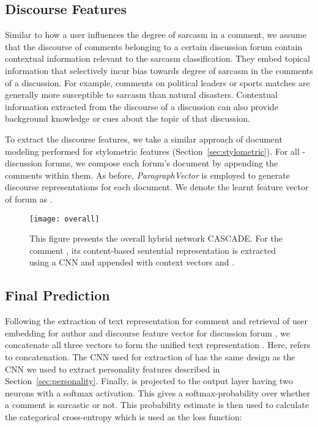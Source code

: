 \documentclass[11pt]{article}
\begin{document}
{\vspace{-0.3cm}
\subsection{Discourse Features} \label{sec:discourse}

Similar to how a user influences the degree of sarcasm in a comment, we assume that the discourse of  comments belonging to a certain discussion forum contain contextual information relevant to the sarcasm classification. They embed topical information that selectively incur bias towards degree of sarcasm in the comments of a discussion. For example, comments on political leaders or sports matches are generally more susceptible to sarcasm than natural disasters. Contextual information extracted from the discourse of a discussion can also provide background knowledge or cues about the topic of that discussion.

To extract the discourse features, we take a similar approach of document modeling performed for stylometric features (Section~\ref{sec:stylometric}). For all -discussion forums, we compose each forum's document by appending the comments within them. As before, \textit{ParagraphVector} is employed to generate discourse representations for each document. We denote the learnt feature vector of  forum  as .

\begin{figure}[t] 
	\centering 
	\texttt{[image: overall]}   
	\caption[]{\footnotesize This figure presents the overall hybrid network CASCADE. For the comment , its content-based sentential representation  is extracted using a CNN and appended with context vectors    and .}
	\label{fig:overall}
    \vspace{-0.3cm}
\end{figure}

    
\subsection{Final Prediction} \label{sec:prediction}

Following the extraction of text representation  for comment  and retrieval of user embedding  for author  and discourse feature vector  for discussion forum , we concatenate all three vectors to form the unified text representation .  Here,  refers to concatenation. The CNN used for extraction of  has the same design as the CNN we used to extract personality features described in Section~\ref{sec:personality}. Finally,  is projected to the output layer having two neurons with a softmax activation. This gives a softmax-probability over whether a comment is sarcastic or not. This probability estimate is then used to calculate the categorical cross-entropy which is used as the loss function:

}
\end{document}
